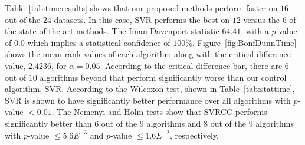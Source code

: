 \documentclass[reqno]{vcuthesis}
\numberwithin{equation}{chapter}
\begin{document}
\begin{table}[t!]
{}\vspace{-1em}
\label{fig:BonfDunnTime}\vspace{-1.5em}
\label{tab:stattime}\vspace{-1.3em}
\scriptsize
{}
\end{table}
Table~{\ref{tab:timeresults}} shows that our proposed methods perform faster on $16$ out of the $24$ datasets. In this case, SVR performs the best on $12$ versus the $6$ of the state-of-the-art methods. The Iman-Davenport statistic $64.41$, with a $p$-value of $0.0$ which implies a statistical confidence of $100\%$. Figure~{\ref{fig:BonfDunnTime}} shows the mean rank values of each algorithm along with the critical difference value, $2.4236$, for $\alpha = 0.05$. According to the critical difference bar, there are $6$ out of $10$ algorithms beyond that perform significantly worse than our control algorithm, SVR.
According to the Wilcoxon test, shown in Table~{\ref{tab:stattime}}, SVR is shown to have significantly better performance over all algorithms with $p$-value $< 0.01$. The Nemenyi and Holm tests show that SVRCC performs significantly better than $6$ out of the $9$ algorithms and $8$ out of the $9$ algorithms with $p$-value $\leq 5.6E^{-3}$ and $p$-value $\leq 1.6E^{-2}$, respectively.
\end{document}
